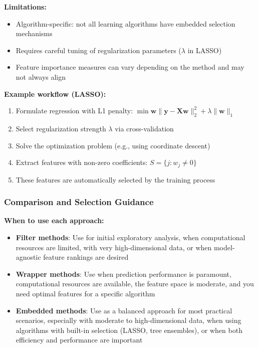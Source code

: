 \textbf{Limitations:}
\begin{itemize}
\item Algorithm-specific: not all learning algorithms have embedded selection mechanisms
\item Requires careful tuning of regularization parameters ($\lambda$ in LASSO)
\item Feature importance measures can vary depending on the method and may not always align
\end{itemize}

\textbf{Example workflow (LASSO):}
\begin{enumerate}
\item Formulate regression with L1 penalty: $\min{\boldsymbol{w}} \|\mathbf{y} - \mathbf{X}\boldsymbol{w}\|_2^2 + \lambda\|\boldsymbol{w}\|_1$
\item Select regularization strength $\lambda$ via cross-validation
\item Solve the optimization problem (e.g., using coordinate descent)
\item Extract features with non-zero coefficients: $S = \{j : w_j \neq 0\}$
\item These features are automatically selected by the training process
\end{enumerate}

\subsubsection*{Comparison and Selection Guidance}

\textbf{When to use each approach:}
\begin{itemize}
\item \textbf{Filter methods}: Use for initial exploratory analysis, when computational resources are limited, with very high-dimensional data, or when model-agnostic feature rankings are desired

\item \textbf{Wrapper methods}: Use when prediction performance is paramount, computational resources are available, the feature space is moderate, and you need optimal features for a specific algorithm

\item \textbf{Embedded methods}: Use as a balanced approach for most practical scenarios, especially with moderate to high-dimensional data, when using algorithms with built-in selection (LASSO, tree ensembles), or when both efficiency and performance are important
\end{itemize}

